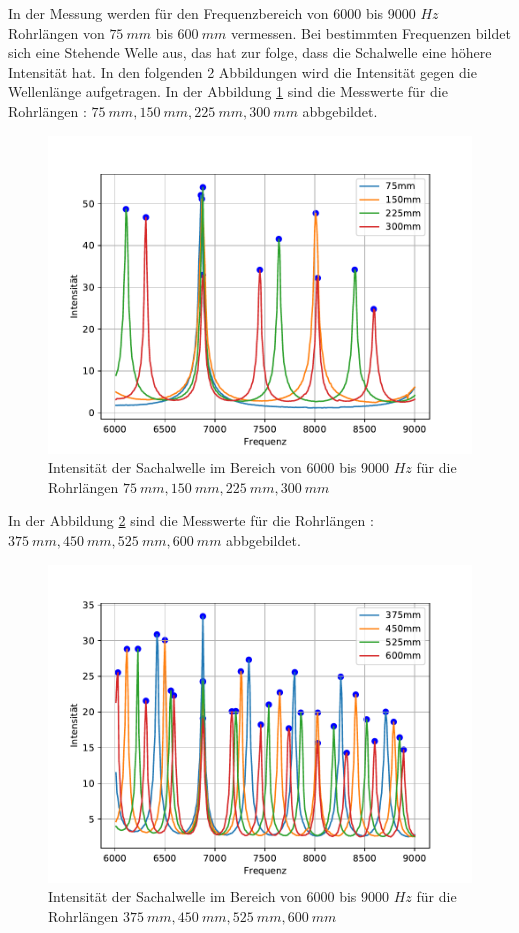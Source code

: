 In der Messung werden für den Frequenzbereich von 6000 bis 9000 $\si{Hz}$ Rohrlängen von $\SI{75}{mm}$ bis $\SI{600}{mm}$ vermessen.
Bei bestimmten Frequenzen bildet sich eine Stehende Welle aus, das hat zur folge, dass die Schalwelle eine höhere Intensität hat.
In den folgenden 2 Abbildungen wird die Intensität gegen die Wellenlänge aufgetragen.
In der Abbildung \ref{fig.1} sind die Messwerte für die Rohrlängen : $\SI{75}{mm}, \SI{150}{mm}, \SI{225}{mm}, \SI{300}{mm}$ abbgebildet.
\begin{figure}[h!]
  \centering
  \includegraphics[width=\textwidth]{1234.pdf}
  \caption{Intensität der Sachalwelle im Bereich von 6000 bis 9000 $\si{Hz}$ für die Rohrlängen $\SI{75}{mm}, \SI{150}{mm}, \SI{225}{mm}, \SI{300}{mm}$}
  \label{fig.1}
\end{figure}
In der Abbildung \ref{fig.2} sind die Messwerte für die Rohrlängen : $\SI{375}{mm}, \SI{450}{mm}, \SI{525}{mm}, \SI{600}{mm}$ abbgebildet.
\begin{figure}[h!]
  \centering
  \includegraphics[width=\textwidth]{5678.pdf}
  \caption{Intensität der Sachalwelle im Bereich von 6000 bis 9000 $\si{Hz}$ für die Rohrlängen $\SI{375}{mm}, \SI{450}{mm}, \SI{525}{mm}, \SI{600}{mm}$}
  \label{fig.2}
\end{figure}
